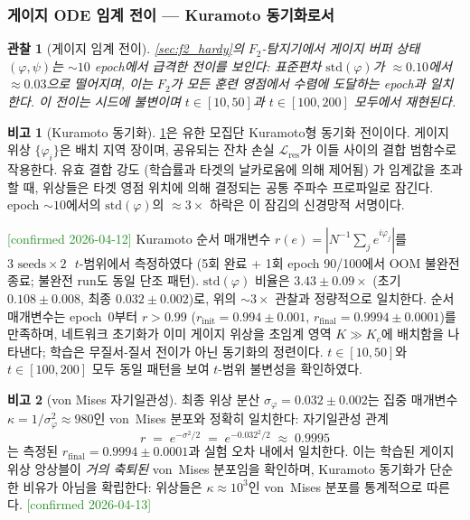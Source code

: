 \documentclass[11pt, a4paper]{article}
\theoremstyle{definition}
\newtheorem{remark}{비고}[section]
\theoremstyle{plain}
\newtheorem{observation}[theorem]{관찰}
\begin{document}
\subsubsection{게이지 ODE 임계 전이 --- Kuramoto 동기화로서}
\label{sec:kuramoto}

\begin{observation}[게이지 임계 전이]
\label{obs:gauge_transition}
\cref{sec:f2_hardy}의 $F_2$-탐지기에서 게이지 버퍼 상태 $(\varphi,\psi)$는 ${\sim}10$ epoch에서 급격한 전이를 보인다: 표준편차 $\mathrm{std}(\varphi)$가 $\approx 0.10$에서 $\approx 0.03$으로 떨어지며, 이는 $F_2$가 모든 훈련 영점에서 수렴에 도달하는 epoch과 일치한다. 이 전이는 시드에 불변이며 $t\in[10,50]$과 $t\in[100,200]$ 모두에서 재현된다.
\end{observation}

\begin{remark}[Kuramoto 동기화]
\label{rem:kuramoto_transition}
\cref{obs:gauge_transition}은 유한 모집단 Kuramoto형 동기화 전이이다. 게이지 위상 $\{\varphi_i\}$은 배치 지역 장이며, 공유되는 잔차 손실 $\mathcal{L}_{\mathrm{res}}$가 이들 사이의 결합 범함수로 작용한다. 유효 결합 강도 (학습률과 타겟의 날카로움에 의해 제어됨) 가 임계값을 초과할 때, 위상들은 타겟 영점 위치에 의해 결정되는 공통 주파수 프로파일로 잠긴다. epoch $\sim 10$에서의 $\mathrm{std}(\varphi)$의 $\approx 3\times$ 하락은 이 잠김의 신경망적 서명이다.

\textcolor{ForestGreen}{[confirmed 2026-04-12]}
Kuramoto 순서 매개변수 $r(e)=|N^{-1}\sum_j e^{i\varphi_j}|$를
$3\text{ seeds}\times 2\text{ }t$-범위에서 측정하였다
(5회 완료 + 1회 epoch 90/100에서 OOM 불완전 종료; 불완전 run도 동일 단조 패턴).
$\mathrm{std}(\varphi)$ 비율은 $3.43\pm0.09\times$
(초기 $0.108\pm0.008$, 최종 $0.032\pm0.002$)로,
위의 ${\sim}3\times$ 관찰과 정량적으로 일치한다.
순서 매개변수는 epoch~$0$부터 $r>0.99$
($r_{\mathrm{init}}=0.994\pm0.001$, $r_{\mathrm{final}}=0.9994\pm0.0001$)를
만족하며, 네트워크 초기화가 이미 게이지 위상을 초임계 영역 $K\gg K_c$에
배치함을 나타낸다; 학습은 무질서-질서 전이가 아닌 동기화의 정련이다.
$t\in[10,50]$와 $t\in[100,200]$ 모두 동일 패턴을 보여 $t$-범위 불변성을 확인하였다.
\end{remark}

\begin{remark}[von Mises 자기일관성]
\label{rem:von_mises}
최종 위상 분산 $\sigma_\varphi = 0.032 \pm 0.002$는
집중 매개변수 $\kappa = 1/\sigma_\varphi^2 \approx 980$인
von~Mises 분포와 정확히 일치한다: 자기일관성 관계
\[
  r \;=\; e^{-\sigma^2/2} \;=\; e^{-0.032^2/2} \;\approx\; 0.9995
\]
는 측정된 $r_{\mathrm{final}} = 0.9994 \pm 0.0001$과
실험 오차 내에서 일치한다. 이는 학습된 게이지 위상 앙상블이
\emph{거의 축퇴된} von~Mises 분포임을 확인하며,
Kuramoto 동기화가 단순한 비유가 아님을 확립한다:
위상들은 $\kappa \approx 10^3$인 von~Mises 분포를
통계적으로 따른다.
\textcolor{ForestGreen}{[confirmed 2026-04-13]}
\end{remark}
\end{document}
